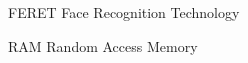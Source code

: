 \begin{siglas}
  \item[FERET] Face Recognition Technology
  \item[RAM] Random Access Memory
\end{siglas}

